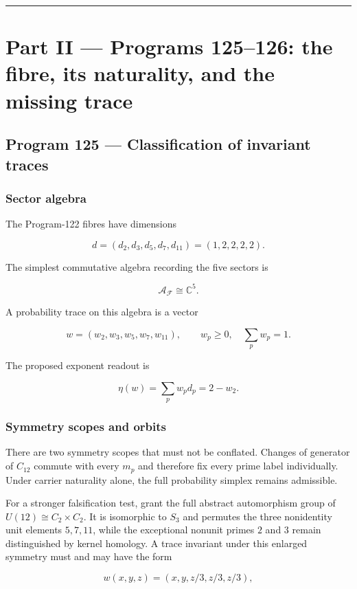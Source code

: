 \documentclass[11pt,a4paper,openany]{report}
\begin{document}
\par\medskip\hrule\medskip

\chapter{Part II --- Programs 125--126: the fibre, its naturality, and the missing trace}

\section{Program 125 --- Classification of invariant traces}

\subsection{Sector algebra}

The Program-122 fibres have dimensions

\[
d=(d_2,d_3,d_5,d_7,d_{11})=(1,2,2,2,2).
\]

The simplest commutative algebra recording the five sectors is

\[
\mathcal A_{\mathcal F}\cong\mathbb C^5.
\]

A probability trace on this algebra is a vector

\[
w=(w_2,w_3,w_5,w_7,w_{11}),
\qquad
w_p\ge0,\quad\sum_p w_p=1.
\]

The proposed exponent readout is

\[
\eta(w)=\sum_p w_p d_p=2-w_2.
\]

\subsection{Symmetry scopes and orbits}

There are two symmetry scopes that must not be conflated. Changes of generator of \(C_{12}\) commute with every \(m_p\) and therefore fix every prime label individually. Under carrier naturality alone, the full probability simplex remains admissible.

For a stronger falsification test, grant the full abstract automorphism group of \(U(12)\cong C_2\times C_2\). It is isomorphic to \(S_3\) and permutes the three nonidentity unit elements \(5,7,11\), while the exceptional nonunit primes \(2\) and \(3\) remain distinguished by kernel homology. A trace invariant under this enlarged symmetry must and may have the form

\[
w(x,y,z)
=
(x,y,z/3,z/3,z/3),
\]
\end{document}
